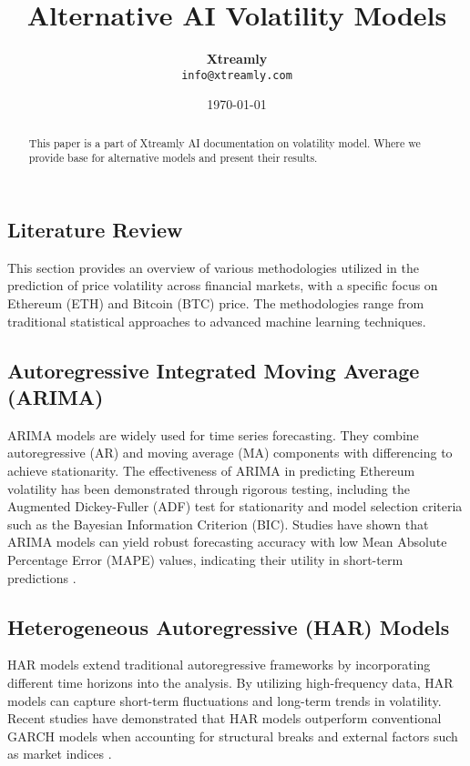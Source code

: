 \documentclass[8pt]{article}
\begin{document}
	
	\title{\textbf{Alternative AI Volatility Models}}
	\author{
		\small
		\textbf{Xtreamly} \\
		\texttt{info@xtreamly.com} \\
	}
	\medskip
	\date{\today}
	\maketitle
	
	\begin{abstract}
		This paper is a part of Xtreamly AI documentation on volatility model. Where we provide base for alternative models and present their results.
	\end{abstract}
	\medskip
	\begin{multicols}{2}
		
		\section{Literature Review}
		\label{sec:litreview}
		
		This section provides an overview of various methodologies utilized in the prediction of price volatility across financial markets, with a specific focus on Ethereum (ETH) and Bitcoin (BTC) price. The methodologies range from traditional statistical approaches to advanced machine learning techniques.
		
		
		\subsection{Autoregressive Integrated Moving Average (ARIMA)}
		ARIMA models are widely used for time series forecasting. They combine autoregressive (AR) and moving average (MA) components with differencing to achieve stationarity. The effectiveness of ARIMA in predicting Ethereum volatility has been demonstrated through rigorous testing, including the Augmented Dickey-Fuller (ADF) test for stationarity and model selection criteria such as the Bayesian Information Criterion (BIC). Studies have shown that ARIMA models can yield robust forecasting accuracy with low Mean Absolute Percentage Error (MAPE) values, indicating their utility in short-term predictions \cite{hyndman2015}.
		
		\subsection{Heterogeneous Autoregressive (HAR) Models}
		HAR models extend traditional autoregressive frameworks by incorporating different time horizons into the analysis. By utilizing high-frequency data, HAR models can capture short-term fluctuations and long-term trends in volatility. Recent studies have demonstrated that HAR models outperform conventional GARCH models when accounting for structural breaks and external factors such as market indices \cite{clements2021}.
		

\end{multicols}
\end{document}
